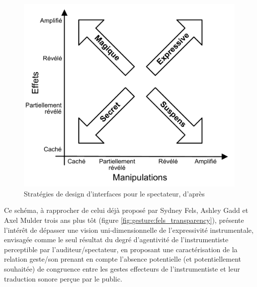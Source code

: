 \begin{figure}[!htbp]
\begin{minipage}[t]{0.48\textwidth}
		\includegraphics[width=1.1\linewidth]{gfx/03_gesture/ManipulationVsEffect2.pdf}
		\caption[Stratégies de design d'interfaces pour le spectateur (Benford)]{Stratégies de design d'interfaces pour le spectateur, d'après \cite{reeves_designing_2005, benford_performing_2010}}
		\label{fig:gesture:Benford}
	\end{minipage}
\end{figure}
\noindent Ce schéma, à rapprocher de celui déjà proposé par Sydney Fels, Ashley Gadd et Axel Mulder trois ans plus tôt (figure \ref{fig:gesture:fels_transparency}), présente l'intérêt de dépasser une vision uni-dimensionnelle de l'expressivité instrumentale, envisagée comme le seul résultat du degré d'agentivité de l'instrumentiste perceptible par l'auditeur/spectateur, en proposant une caractérisation de la relation geste/son prenant en compte l'absence potentielle (et potentiellement souhaitée) de congruence entre les gestes effecteurs de l'instrumentiste et leur traduction sonore perçue par le public.\\
